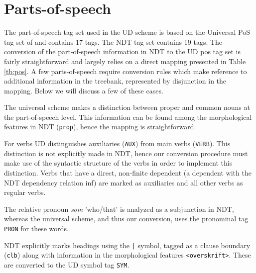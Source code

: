 \documentclass[10pt, a4paper]{article}
\begin{document}
\section{Parts-of-speech}
The part-of-speech tag set used in the UD scheme is based on the
Universal PoS tag set of  and contains 17 tags. The NDT tag set
contains 19 tags.  The conversion of the part-of-speech information in
NDT to the UD pos tag set is fairly straightforward and largely relies
on a direct mapping presented in Table \ref{tb:pos}.  A few
parts-of-speech require conversion rules which make reference to
additional information in the treebank, represented by disjunction
in the mapping. Below we will discuss a few of these cases.


The universal scheme makes a distinction between proper and common
nouns at the part-of-speech level. This information can be found among
the morphological features in NDT ({\tt prop}), hence the mapping is
straightforward.

For verbs UD distinguishes auxiliaries ({\tt AUX}) from main
verbs ({\tt VERB}).  This distinction is not explicitly made in
NDT, hence our conversion procedure must make use of the syntactic
structure of the verbs in order to implement this distinction. Verbs
that have a direct, non-finite dependent (a dependent with the NDT
dependency relation {\sc inf}) are marked as auxiliaries and all other
verbs as regular verbs.

The relative pronoun {\it som} 'who/that' is analyzed as a subjunction
in NDT, whereas the universal scheme, and thus our conversion, uses
the pronominal tag {\tt PRON} for these words.

NDT explicitly marks headings using the {\tt |} symbol, tagged as a
clause boundary ({\tt clb}) along with information in the
morphological features {\tt <overskrift>}. These are converted to the
UD symbol tag {\tt SYM}.
\end{document}
